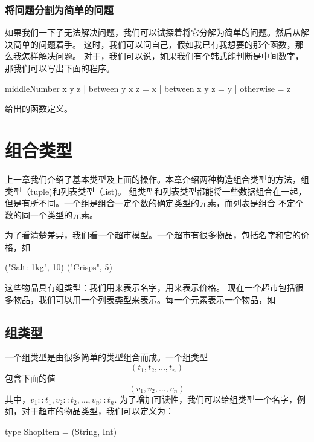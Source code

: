 \subsection*{将问题分割为简单的问题}

如果我们一下子无法解决问题，我们可以试探着将它分解为简单的问题。然后从解决简单的问题着手。
这时，我们可以问自己，假如我已有我想要的那个函数，那么我怎样解决问题。
对于，我们可以说，如果我们有个韩式能判断是中间数字，那我们可以写出下面的程序。
\begin{code}
middleNumber x y z
   | between y x z = x
   | between x y z = y
   | otherwise     = z
\end{code}

\begin{exercise}
给出的函数定义。
\end{exercise}

\chapter{组合类型}

上一章我们介绍了基本类型及上面的操作。本章介绍两种构造组合类型的方法，组类型（tuple)和列表类型（list)。
组类型和列表类型都能将一些数据组合在一起，但是有所不同。一个组是组合一定个数的确定类型的元素，而列表是组合
不定个数的同一个类型的元素。

为了看清楚差异，我们看一个超市模型。一个超市有很多物品，包括名字和它的价格，如
\begin{xcode}
("Salt: 1kg", 10)
("Crisps", 5)
\end{xcode}
这些物品具有组类型：我们用来表示名字，用来表示价格。
现在一个超市包括很多物品，我们可以用一个列表类型来表示。每一个元素表示一个物品，如
\begin{code}
\end{code}

\section{组类型}

一个组类型是由很多简单的类型组合而成。一个组类型
\[
(t_1, t_2, \ldots, t_n)
\]
包含下面的值
\[
(v_1,v_2, \ldots, v_n)
\]
其中，$v_1 :: t_1, v_2 :: t_2, \ldots, v_n :: t_n$.
为了增加可读性，我们可以给组类型一个名字，例如，对于超市的物品类型，我们可以定义为：
\begin{code}
type ShopItem = (String, Int)
\end{code}

